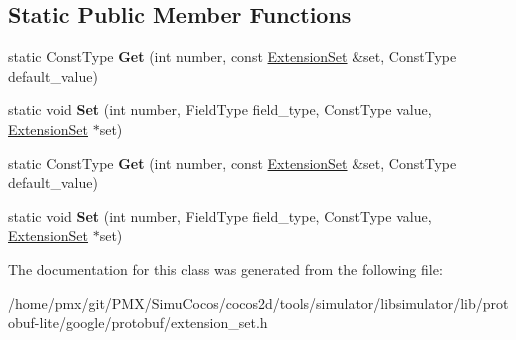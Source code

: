 \subsection*{Static Public Member Functions}
\begin{DoxyCompactItemize}
\item 
\mbox{\label{classgoogle_1_1protobuf_1_1internal_1_1PrimitiveTypeTraits_af5cce6f39afbab2400ceb399c5e343da}} 
static Const\+Type {\bfseries Get} (int number, const \hyperlink{classgoogle_1_1protobuf_1_1internal_1_1ExtensionSet}{Extension\+Set} \&set, Const\+Type default\+\_\+value)
\item 
\mbox{\label{classgoogle_1_1protobuf_1_1internal_1_1PrimitiveTypeTraits_ae595c1ff9f0ab256edf148438682d636}} 
static void {\bfseries Set} (int number, Field\+Type field\+\_\+type, Const\+Type value, \hyperlink{classgoogle_1_1protobuf_1_1internal_1_1ExtensionSet}{Extension\+Set} $\ast$set)
\item 
\mbox{\label{classgoogle_1_1protobuf_1_1internal_1_1PrimitiveTypeTraits_af5cce6f39afbab2400ceb399c5e343da}} 
static Const\+Type {\bfseries Get} (int number, const \hyperlink{classgoogle_1_1protobuf_1_1internal_1_1ExtensionSet}{Extension\+Set} \&set, Const\+Type default\+\_\+value)
\item 
\mbox{\label{classgoogle_1_1protobuf_1_1internal_1_1PrimitiveTypeTraits_ae595c1ff9f0ab256edf148438682d636}} 
static void {\bfseries Set} (int number, Field\+Type field\+\_\+type, Const\+Type value, \hyperlink{classgoogle_1_1protobuf_1_1internal_1_1ExtensionSet}{Extension\+Set} $\ast$set)
\end{DoxyCompactItemize}


The documentation for this class was generated from the following file\+:\begin{DoxyCompactItemize}
\item 
/home/pmx/git/\+P\+M\+X/\+Simu\+Cocos/cocos2d/tools/simulator/libsimulator/lib/protobuf-\/lite/google/protobuf/extension\+\_\+set.\+h\end{DoxyCompactItemize}
